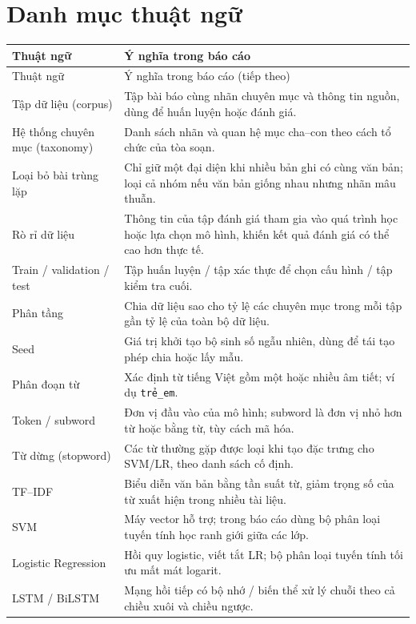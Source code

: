 \chapter*{Danh mục thuật ngữ}
\begin{longtable}{p{35mm}p{115mm}}
\toprule Thuật ngữ & Ý nghĩa trong báo cáo\\\midrule
\endfirsthead
\toprule Thuật ngữ & Ý nghĩa trong báo cáo (tiếp theo)\\\midrule
\endhead
\bottomrule\endfoot
Tập dữ liệu (corpus) & Tập bài báo cùng nhãn chuyên mục và thông tin nguồn, dùng để huấn luyện hoặc đánh giá.\\
Hệ thống chuyên mục (taxonomy) & Danh sách nhãn và quan hệ mục cha--con theo cách tổ chức của tòa soạn.\\
Loại bỏ bài trùng lặp & Chỉ giữ một đại diện khi nhiều bản ghi có cùng văn bản; loại cả nhóm nếu văn bản giống nhau nhưng nhãn mâu thuẫn.\\
Rò rỉ dữ liệu & Thông tin của tập đánh giá tham gia vào quá trình học hoặc lựa chọn mô hình, khiến kết quả đánh giá có thể cao hơn thực tế.\\
Train / validation / test & Tập huấn luyện / tập xác thực để chọn cấu hình / tập kiểm tra cuối.\\
Phân tầng & Chia dữ liệu sao cho tỷ lệ các chuyên mục trong mỗi tập gần tỷ lệ của toàn bộ dữ liệu.\\
Seed & Giá trị khởi tạo bộ sinh số ngẫu nhiên, dùng để tái tạo phép chia hoặc lấy mẫu.\\
Phân đoạn từ & Xác định từ tiếng Việt gồm một hoặc nhiều âm tiết; ví dụ \texttt{trẻ\_em}.\\
Token / subword & Đơn vị đầu vào của mô hình; subword là đơn vị nhỏ hơn từ hoặc bằng từ, tùy cách mã hóa.\\
Từ dừng (stopword) & Các từ thường gặp được loại khi tạo đặc trưng cho SVM/LR, theo danh sách cố định.\\
TF--IDF & Biểu diễn văn bản bằng tần suất từ, giảm trọng số của từ xuất hiện trong nhiều tài liệu.\\
SVM & Máy vector hỗ trợ; trong báo cáo dùng bộ phân loại tuyến tính học ranh giới giữa các lớp.\\
Logistic Regression & Hồi quy logistic, viết tắt LR; bộ phân loại tuyến tính tối ưu mất mát logarit.\\
LSTM / BiLSTM & Mạng hồi tiếp có bộ nhớ / biến thể xử lý chuỗi theo cả chiều xuôi và chiều ngược.\\

\end{longtable}
